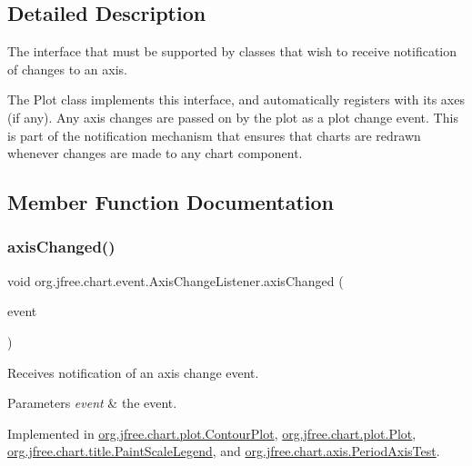 \subsection{Detailed Description}
The interface that must be supported by classes that wish to receive notification of changes to an axis. 

The Plot class implements this interface, and automatically registers with its axes (if any). Any axis changes are passed on by the plot as a plot change event. This is part of the notification mechanism that ensures that charts are redrawn whenever changes are made to any chart component. 

\subsection{Member Function Documentation}
\mbox{\label{interfaceorg_1_1jfree_1_1chart_1_1event_1_1_axis_change_listener_a0598d6b49c0ec1aff38fe39d34297b87}} 
\subsubsection{\texorpdfstring{axis\+Changed()}{axisChanged()}}
{\footnotesize\ttfamily void org.\+jfree.\+chart.\+event.\+Axis\+Change\+Listener.\+axis\+Changed (\begin{DoxyParamCaption}\item[{\mbox{\hyperlink{classorg_1_1jfree_1_1chart_1_1event_1_1_axis_change_event}{Axis\+Change\+Event}}}]{event }\end{DoxyParamCaption})}

Receives notification of an axis change event.


\begin{DoxyParams}{Parameters}
{\em event} & the event. \\
\hline
\end{DoxyParams}


Implemented in \mbox{\hyperlink{classorg_1_1jfree_1_1chart_1_1plot_1_1_contour_plot_a59029d9c4f1fa0ecbd4d201ab0f01189}{org.\+jfree.\+chart.\+plot.\+Contour\+Plot}}, \mbox{\hyperlink{classorg_1_1jfree_1_1chart_1_1plot_1_1_plot_ab4541100d154f3585628f3d57fd9957d}{org.\+jfree.\+chart.\+plot.\+Plot}}, \mbox{\hyperlink{classorg_1_1jfree_1_1chart_1_1title_1_1_paint_scale_legend_a71b207d9716dc46b726ebae0282ce0a8}{org.\+jfree.\+chart.\+title.\+Paint\+Scale\+Legend}}, and \mbox{\hyperlink{classorg_1_1jfree_1_1chart_1_1axis_1_1_period_axis_test_a951dc996bd0b09bd930878a5e2041cad}{org.\+jfree.\+chart.\+axis.\+Period\+Axis\+Test}}.




